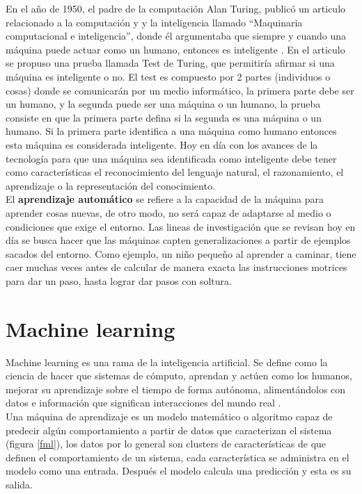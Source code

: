 \documentclass[twoside,spanish,ESP,MSc]{plantillaLabUPV}
\theoremstyle{definition}
\begin{document}
En el año de 1950, el padre de la computación Alan Turing, publicó un articulo relacionado a la computación y y la inteligencia llamado ``Maquinaria computacional e inteligencia'', donde él argumentaba que siempre y cuando una máquina puede actuar como un humano, entonces es inteligente \cite{iabook}. En el articulo se propuso una prueba llamada Test de Turing, que permitiría afirmar si una máquina es inteligente o no. El test es compuesto por 2 partes (individuos o cosas) donde se comunicarán por un medio informático, la primera parte debe ser un humano, y la segunda puede ser una máquina o un humano, la prueba consiste en que la primera parte defina si la segunda es una máquina o un humano. Si la primera parte identifica a una máquina como humano entonces esta máquina es considerada inteligente. Hoy en día con los avances de la tecnología para que una máquina sea identificada como inteligente debe tener como características el reconocimiento del lenguaje natural, el razonamiento, el aprendizaje o la representación del conocimiento.\\


El \textbf{aprendizaje automático} se refiere a la capacidad de la máquina para aprender cosas nuevas, de otro modo, no será capaz de adaptarse al medio o condiciones que exige el entorno. Las lineas de investigación que se revisan hoy en día se busca hacer que las máquinas capten generalizaciones a partir de ejemplos sacados del entorno. Como ejemplo, un niño pequeño al aprender a caminar, tiene caer muchas veces antes de calcular de manera exacta las instrucciones motrices para dar un paso, hasta lograr dar pasos con soltura.


\section{Machine learning}

Machine learning es una rama de la inteligencia artificial. Se define como la ciencia de hacer que sistemas de cómputo, aprendan y actúen como los humanos, mejorar su aprendizaje sobre el tiempo de forma autónoma, alimentándolos con datos e información que significan interacciones del mundo real \cite{supervisadobook}.\\

Una máquina de aprendizaje es un modelo matemático o algoritmo capaz de predecir algún comportamiento a partir de datos que caracterizan el sistema (figura \ref{fml}), los datos por lo general son clusters de características de que definen el comportamiento de un sistema, cada característica se administra en el modelo como una entrada. Después el modelo calcula una predicción y esta es su salida.
\end{document}

